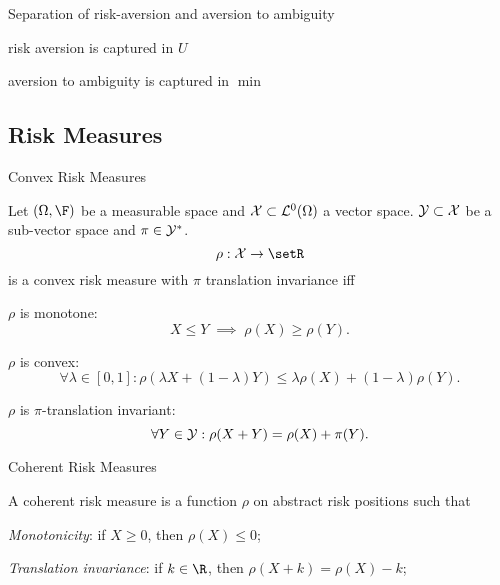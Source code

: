 	Separation of risk-aversion and aversion to ambiguity






	risk aversion is captured in $U$

	aversion to ambiguity is captured in $\min$











\subsection{Risk Measures}

{Convex Risk Measures}

Let $(\Omega, \F)$ be a measurable space and ${\cal X} \subset {\cal L}^0(\Omega)$ a vector space. ${\cal Y} \subset {\cal X}$ be a sub-vector space and
$\pi \in {\cal Y}^*$.
\begin{equation}
\rho: {\cal X} \rightarrow \setR
\end{equation}
is a convex risk measure with $\pi$ translation invariance iff






	$\rho$ is monotone: $$X \leq Y \;  \implies \; \rho(X) \geq \rho(Y).$$

	$\rho$ is convex: $$\forall \lambda \in [0,1]: \rho(\lambda X + (1-\lambda) Y) \leq \lambda \rho(X) + (1-\lambda) \rho(Y).$$

	$\rho$ is $\pi$-translation invariant: $$\forall Y \in {\cal Y}: \rho(X+Y) = \rho(X) + \pi(Y).$$






{Coherent Risk Measures}

A coherent risk measure is a function $\rho$ on abstract risk positions such that






	\emph{Monotonicity}: if $X\geq 0$, then $\rho(X)\leq 0$;

	\emph{Translation invariance}: if $k \in \R$, then
$\rho(X+k)=\rho(X)-k$;

